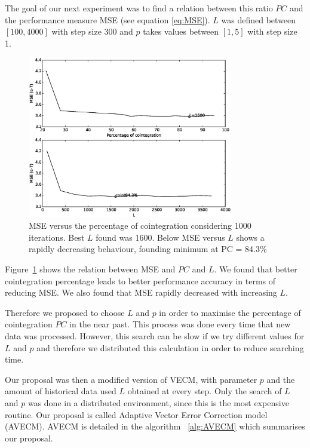 The goal of our next experiment was to find a relation between this ratio
$PC$ and the performance measure MSE (see equation 
\ref{eq:MSE}). $L$ was defined between $[100,4000]$ with step size 300 and $p$ takes values between $[1,5]$ with step size 1.  

\begin{figure}[ht!]
  \centering
  \includegraphics[width=0.8\textwidth]{img/MSE-offset20520-p-2-freq-10s}
  \caption{MSE versus the percentage of cointegration considering 1000
  iterations. Best $L$ found was 1600. Below MSE versus $L$ shows a rapidly decreasing behaviour, founding minimum at PC = 84.3\% }
  \label{fig:cointvsmse}
\end{figure}

Figure~\ref{fig:cointvsmse} shows the relation between MSE and $PC$ and $L$.
We found that better cointegration percentage leads to better
performance accuracy in terms of reducing MSE. We also found that MSE rapidly decreased with increasing $L$.

Therefore we proposed to choose $L$ and $p$ in order to maximise the percentage of
cointegration $PC$ in the near past. This process was done every time that new data was processed. However, this search can be slow if we try different values for $L$ and $p$ and therefore we distributed this calculation in order to reduce searching time.

Our proposal was then a modified version of VECM, with parameter $p$ and the amount of historical data used $L$ obtained at every step. Only the search of $L$ and $p$ was done in a distributed environment, since this is the most expensive routine. Our proposal is called Adaptive Vector Error Correction model (AVECM).
AVECM is detailed in the algorithm ~\ref{alg:AVECM} which summarises our proposal. 

